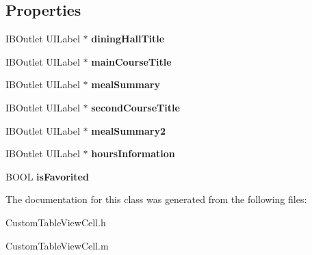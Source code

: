 \subsection*{Properties}
\begin{DoxyCompactItemize}
\item 
\hypertarget{interface_custom_table_view_cell_a75316469ff830cde4c7c424a71895c83}{
IBOutlet UILabel $\ast$ {\bfseries diningHallTitle}}
\label{interface_custom_table_view_cell_a75316469ff830cde4c7c424a71895c83}

\item 
\hypertarget{interface_custom_table_view_cell_aa94bff6eb2ce1ac94b195268e19dc7ef}{
IBOutlet UILabel $\ast$ {\bfseries mainCourseTitle}}
\label{interface_custom_table_view_cell_aa94bff6eb2ce1ac94b195268e19dc7ef}

\item 
\hypertarget{interface_custom_table_view_cell_a953b21da377848c05b3096974256c8d8}{
IBOutlet UILabel $\ast$ {\bfseries mealSummary}}
\label{interface_custom_table_view_cell_a953b21da377848c05b3096974256c8d8}

\item 
\hypertarget{interface_custom_table_view_cell_a2a84c24d51957434843cf709aaa23934}{
IBOutlet UILabel $\ast$ {\bfseries secondCourseTitle}}
\label{interface_custom_table_view_cell_a2a84c24d51957434843cf709aaa23934}

\item 
\hypertarget{interface_custom_table_view_cell_a4f12f0ae4f2c5623db2fe9f8b3dfa73d}{
IBOutlet UILabel $\ast$ {\bfseries mealSummary2}}
\label{interface_custom_table_view_cell_a4f12f0ae4f2c5623db2fe9f8b3dfa73d}

\item 
\hypertarget{interface_custom_table_view_cell_adbba569b401f4f291e4d0e40a4238a29}{
IBOutlet UILabel $\ast$ {\bfseries hoursInformation}}
\label{interface_custom_table_view_cell_adbba569b401f4f291e4d0e40a4238a29}

\item 
\hypertarget{interface_custom_table_view_cell_ac44e4ec9bf8babb62b05eb94a82ef724}{
BOOL {\bfseries isFavorited}}
\label{interface_custom_table_view_cell_ac44e4ec9bf8babb62b05eb94a82ef724}

\end{DoxyCompactItemize}


The documentation for this class was generated from the following files:\begin{DoxyCompactItemize}
\item 
CustomTableViewCell.h\item 
CustomTableViewCell.m\end{DoxyCompactItemize}
